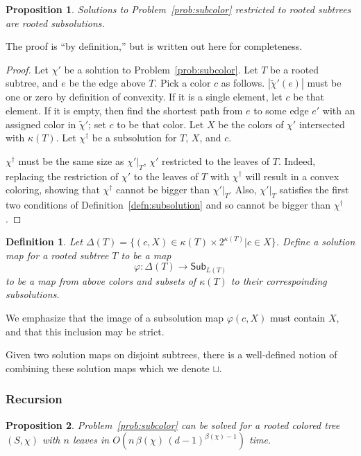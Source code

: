 \documentclass{amsart}
\newcommand{\col}{\chi}
\newcommand{\subcol}{\chi'}
\newcommand{\altcol}{\chi^{\dag}}
\newcommand{\subcolt}{\tilde{\chi}'}
\newcommand{\subcolS}{\mathsf{Sub}}
\newcommand{\subcolST}{\subcolS_{L(T)}}
\newcommand{\subunion}{\sqcup}
\newcommand{\cut}{\kappa}
\newcommand{\bad}{\beta}
\newtheorem{prop}{Proposition}
\newtheorem{defn}{Definition}
\begin{document}
\begin{prop}
  \label{prop:subsolution}
  Solutions to Problem~\ref{prob:subcolor} restricted to rooted subtrees are rooted subsolutions.
\end{prop}

The proof is ``by definition,'' but is written out here for completeness.

\begin{proof}
  Let $\subcol$ be a solution to Problem~\ref{prob:subcolor}.
  Let $T$ be a rooted subtree, and $e$ be the edge above $T$.
  Pick a color $c$ as follows.
  $|\subcolt(e)|$ must be one or zero by definition of convexity.
  If it is a single element, let $c$ be that element.
  If it is empty, then find the shortest path from $e$ to some edge $e'$ with an assigned color in $\subcolt$; set $c$ to be that color.
  Let $X$ be the colors of $\subcol$ intersected with $\cut(T)$.
  Let $\altcol$ be a subsolution for $T$, $X$, and $c$.

  $\altcol$ must be the same size as $\subcol|_T$, $\subcol$ restricted to the leaves of $T$.
  Indeed, replacing the restriction of $\subcol$ to the leaves of $T$ with $\altcol$ will result in a convex coloring, showing that $\altcol$ cannot be bigger than $\subcol|_T$.
  Also, $\subcol|_T$ satisfies the first two conditions of Definition~\ref{defn:subsolution} and so cannot be bigger than $\altcol$.
\end{proof}

\begin{defn}
  Let $\Delta(T) = \{(c,X) \in \cut(T) \times 2^{\cut(T)} | c \in X\}$.
  Define a solution map for a rooted subtree $T$ to be a map
  \[
    \varphi: \Delta(T) \rightarrow \subcolST
  \]
  to be a map from above colors and subsets of $\cut(T)$ to their correspoinding subsolutions.
\end{defn}
We emphasize that the image of a subsolution map $\varphi(c,X)$ must contain $X$, and that this inclusion may be strict.

Given two solution maps on disjoint subtrees, there is a well-defined notion of combining these solution maps which we denote $\subunion$.


\subsubsection{Recursion}

\begin{prop}
Problem~\ref{prob:subcolor} can be solved for a rooted colored tree $(S, \col)$ with $n$ leaves in $O(n \, \bad(\col) \, (d-1)^{\bad(\col)-1})$ time.
\end{prop}
\end{document}
